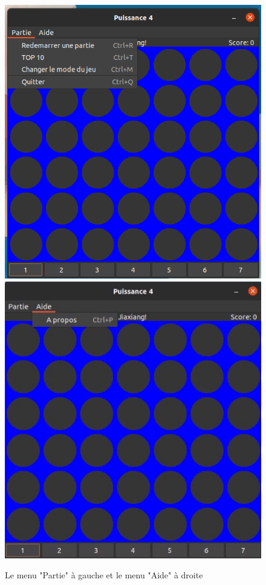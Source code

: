 \documentclass[a4paper, 11pt, oneside]{article}
\begin{document}
\begin{figure}[h]
    \center
    \includegraphics[scale = 0.30]{image2.png}
    \includegraphics[scale = 0.15]{image3.jpg}
    \caption{Le menu "Partie" à gauche et le menu "Aide" à droite}
\end{figure}
\end{document}
